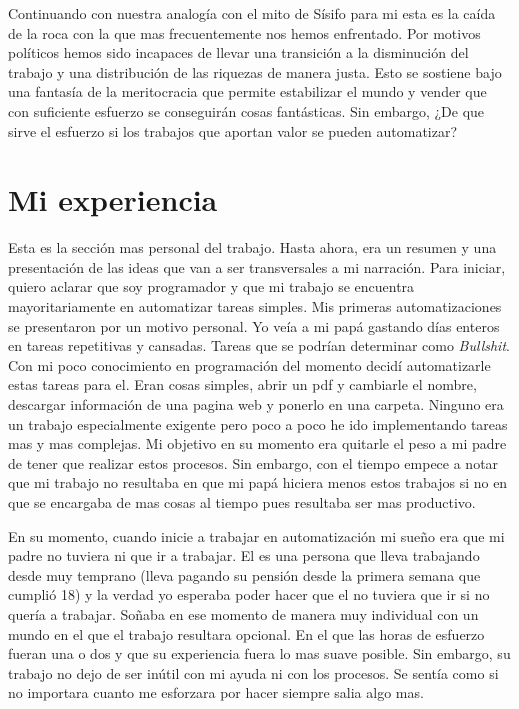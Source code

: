 \documentclass{report}
\begin{document}
Continuando con nuestra analogía con el mito de Sísifo para mi esta es la caída de la roca con la que mas frecuentemente nos hemos enfrentado. Por motivos políticos hemos sido incapaces de llevar una transición a la disminución del trabajo y una distribución de las riquezas de manera justa. Esto se sostiene bajo una fantasía de la meritocracia que permite estabilizar el mundo y vender que con suficiente esfuerzo se conseguirán cosas fantásticas. Sin embargo, ¿De que sirve el esfuerzo si los trabajos que aportan valor se pueden automatizar?

\section{Mi experiencia}

Esta es la sección mas personal del trabajo. Hasta ahora, era un resumen y una presentación de las ideas que van a ser transversales a mi narración. Para iniciar, quiero aclarar que soy programador y que mi trabajo se encuentra mayoritariamente en automatizar tareas simples. Mis primeras automatizaciones se presentaron por un motivo personal. Yo veía a mi papá gastando días enteros en tareas repetitivas y cansadas. Tareas que se podrían determinar como \textit{Bullshit}. Con mi poco conocimiento en programación del momento decidí automatizarle estas tareas para el. Eran cosas simples, abrir un pdf y cambiarle el nombre, descargar información de una pagina web y ponerlo en una carpeta. Ninguno era un trabajo especialmente exigente pero poco a poco he ido implementando tareas mas y mas complejas. Mi objetivo en su momento era quitarle el peso a mi padre de tener que realizar estos procesos. Sin embargo, con el tiempo empece a notar que mi trabajo no resultaba en que mi papá hiciera menos estos trabajos si no en que se encargaba de mas cosas al tiempo pues resultaba ser mas productivo.

En su momento, cuando inicie a trabajar en automatización mi sueño era que mi padre no tuviera ni que ir a trabajar. El es una persona que lleva trabajando desde muy temprano (lleva pagando su pensión desde la primera semana que cumplió 18) y la verdad yo esperaba poder hacer que el no tuviera que ir si no quería a trabajar. Soñaba en ese momento de manera muy individual con un mundo en el que el trabajo resultara opcional. En el que las horas de esfuerzo fueran una o dos y que su experiencia fuera lo mas suave posible. Sin embargo, su trabajo no dejo de ser inútil con mi ayuda ni con los procesos. Se sentía como si no importara cuanto me esforzara por hacer siempre salia algo mas.
\end{document}
